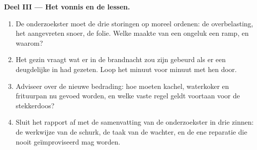 \begin{problem}
\medskip\noindent\textbf{Deel III --- Het vonnis en de lessen.}
\begin{enumerate}[resume]
  \item De onderzoekster moet de drie storingen op moreel
         ordenen: de overbelasting, het aangevreten snoer, de
        folie. Welke maakte van een ongeluk een ramp, en waarom?
  \item Het gezin vraagt wat er in de brandnacht zou zijn gebeurd
        als er een deugdelijke  in had gezeten. Loop het
        minuut voor minuut met hen door.
  \item Adviseer over de nieuwe bedrading: hoe moeten kachel,
        waterkoker en frituurpan nu gevoed worden, en welke vaste
        regel geldt voortaan voor de stekkerdoos?
  \item Sluit het rapport af met de samenvatting van de
        onderzoekster in drie zinnen: de werkwijze van de schurk, de
        taak van de wachter, en de ene reparatie die nooit
        geïmproviseerd mag worden.
\end{enumerate}
\end{problem}
